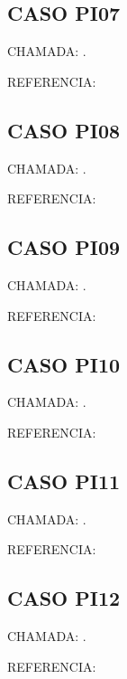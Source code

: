 \documentclass{undftex}
\begin{document}
\begin{refsection}\section*{CASO PI07} CHAMADA: . \textcite{pi07}\par REFERENCIA:\par\printbibliography[heading=none,check=undfconsultadas]\end{refsection}\clearpage
\begin{refsection}\section*{CASO PI08} CHAMADA: . \textcite{pi08}\par REFERENCIA:\par\printbibliography[heading=none,check=undfconsultadas]\end{refsection}\clearpage
\begin{refsection}\section*{CASO PI09} CHAMADA: . \textcite{pi09}\par REFERENCIA:\par\printbibliography[heading=none,check=undfconsultadas]\end{refsection}\clearpage
\begin{refsection}\section*{CASO PI10} CHAMADA: . \textcite{pi10}\par REFERENCIA:\par\printbibliography[heading=none,check=undfconsultadas]\end{refsection}\clearpage
\begin{refsection}\section*{CASO PI11} CHAMADA: . \textcite{pi11}\par REFERENCIA:\par\printbibliography[heading=none,check=undfconsultadas]\end{refsection}\clearpage
\begin{refsection}\section*{CASO PI12} CHAMADA: . \textcite{pi12}\par REFERENCIA:\par\printbibliography[heading=none,check=undfconsultadas]\end{refsection}\clearpage
\end{document}
